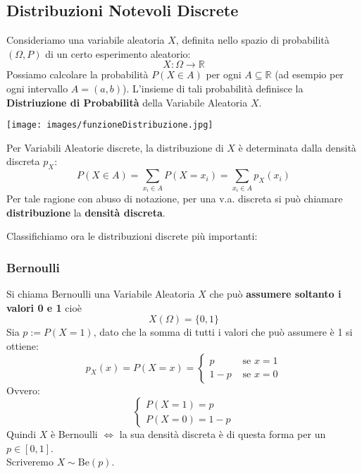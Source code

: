 
\subsection{Distribuzioni Notevoli Discrete}
Consideriamo una variabile aleatoria $X$, definita nello spazio di probabilità
$(\Omega, P)$ di un certo esperimento aleatorio:
\[
	X:\Omega \rightarrow \mathbb{R}
\]
Possiamo calcolare la probabilità $P(X \in A)$ per ogni $A \subseteq \mathbb{R}$
(ad esempio per ogni intervallo $A=(a,b)$).
L'insieme di tali probabilità definisce la \textbf{Distriuzione di Probabilità} della Variabile Aleatoria $X$.
\begin{center}
	\texttt{[image: images/funzioneDistribuzione.jpg]}
\end{center}

Per Variabili Aleatorie discrete, la distribuzione di $X$ è determinata dalla densità discreta $p_X$:
\[
	P(X \in A) = \sum_{x_i \in A} P(X=x_i) = \sum_{x_i \in A} p_X(x_i)
\]
Per tale ragione con abuso di notazione, per una v.a. discreta si può chiamare
\textbf{distribuzione} la \textbf{densità discreta}.

Classifichiamo ora le distribuzioni discrete più importanti:

\subsubsection{Bernoulli}
Si chiama Bernoulli una Variabile Aleatoria $X$ che può \textbf{assumere soltanto i valori 0 e 1} cioè
\[
	X(\Omega) = \{0,1\}
\]
Sia $p:=P(X=1)$, dato che la somma di tutti i valori che può assumere è 1 si ottiene:
\[
	p_X (x) = P(X=x) =
	\begin{cases}
		p   & \text{ se } x=1 \\
		1-p & \text{ se } x=0
	\end{cases}
\]
Ovvero:
\[
	\begin{cases}
		P(X=1) = p \\
		P(X=0)= 1-p
	\end{cases}
\]
Quindi $X$ è Bernoulli $\Leftrightarrow$ la sua densità discreta è di questa
forma per un $p \in [0,1]$.
\\ Scriveremo $X \sim \text{Be}(p)$.

